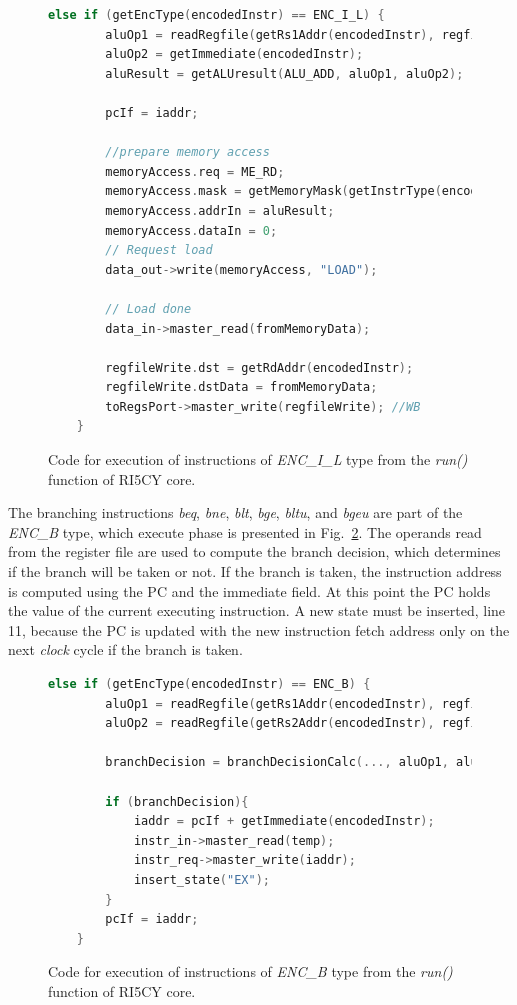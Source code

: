 \begin{figure}[htb!]
    \begin{lstlisting}[language=c++]
    else if (getEncType(encodedInstr) == ENC_I_L) {
        aluOp1 = readRegfile(getRs1Addr(encodedInstr), regfile);
        aluOp2 = getImmediate(encodedInstr);
        aluResult = getALUresult(ALU_ADD, aluOp1, aluOp2);
        
        pcIf = iaddr;
        
        //prepare memory access
        memoryAccess.req = ME_RD;
        memoryAccess.mask = getMemoryMask(getInstrType(encodedInstr));
        memoryAccess.addrIn = aluResult;
        memoryAccess.dataIn = 0;
        // Request load
        data_out->write(memoryAccess, "LOAD");
        
        // Load done
        data_in->master_read(fromMemoryData);
        
        regfileWrite.dst = getRdAddr(encodedInstr);
        regfileWrite.dstData = fromMemoryData;
        toRegsPort->master_write(regfileWrite); //WB
    }\end{lstlisting}
    \caption{Code for execution of instructions of \textit{ENC\_I\_L} type from the \textit{run()} function of RI5CY core.}
    \label{fig:ri5cy-enc-i-l}
\end{figure}

The branching instructions \textit{beq}, \textit{bne}, \textit{blt}, \textit{bge}, \textit{bltu}, and \textit{bgeu} are part of the \textit{ENC\_B} type, which execute phase is presented in Fig.~\ref{fig:ri5cy-enc-b}. The operands read from the register file are used to compute the branch decision, which determines if the branch will be taken or not. If the branch is taken, the instruction address is computed using the PC and the immediate field. At this point the PC holds the value of the current executing instruction. A new state must be inserted, line 11, because the PC is updated with the new instruction fetch address only on the next \textit{clock} cycle if the branch is taken.

\begin{figure}[htb!]
    \begin{lstlisting}[language=c++]
    else if (getEncType(encodedInstr) == ENC_B) {
        aluOp1 = readRegfile(getRs1Addr(encodedInstr), regfile);
        aluOp2 = readRegfile(getRs2Addr(encodedInstr), regfile);
        
        branchDecision = branchDecisionCalc(..., aluOp1, aluOp2);
        
        if (branchDecision){
            iaddr = pcIf + getImmediate(encodedInstr);
            instr_in->master_read(temp);
            instr_req->master_write(iaddr);
            insert_state("EX");
        }
        pcIf = iaddr;
    } \end{lstlisting}
    \caption{Code for execution of instructions of \textit{ENC\_B} type from the \textit{run()} function of RI5CY core.}
    \label{fig:ri5cy-enc-b}
\end{figure}

